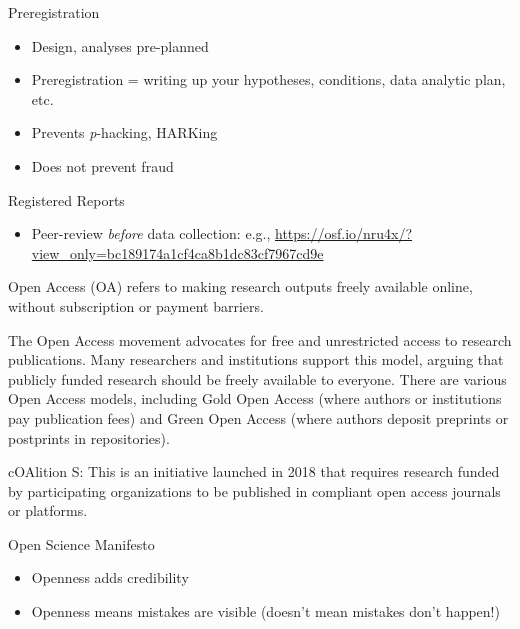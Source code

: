 \documentclass[
  ignorenonframetext,
  aspectratio=169,
]{beamer}
\providecommand{\tightlist}{%
  \setlength{\itemsep}{0pt}\setlength{\parskip}{0pt}}\usepackage{longtable,booktabs,array}
\begin{document}
\begin{frame}{Preregistration}
\label{preregistration}
\begin{itemize}
\tightlist
\item
  Design, analyses pre-planned
\item
  Preregistration = writing up your hypotheses, conditions, data
  analytic plan, etc.
\item
  Prevents \emph{p}-hacking, HARKing
\item
  Does not prevent fraud
\end{itemize}
\end{frame}

\begin{frame}{Registered Reports}
\label{registered-reports}
\begin{itemize}
\tightlist
\item
  Peer-review \emph{before} data collection: e.g.,
  \url{https://osf.io/nru4x/?view_only=bc189174a1cf4ca8b1dc83cf7967cd9e}
\end{itemize}
\end{frame}

\begin{frame}{}
\label{section-2}
Open Access (OA) refers to making research outputs freely available
online, without subscription or payment barriers.

The Open Access movement advocates for free and unrestricted access to
research publications. Many researchers and institutions support this
model, arguing that publicly funded research should be freely available
to everyone. There are various Open Access models, including Gold Open
Access (where authors or institutions pay publication fees) and Green
Open Access (where authors deposit preprints or postprints in
repositories).

cOAlition S: This is an initiative launched in 2018 that requires
research funded by participating organizations to be published in
compliant open access journals or platforms.
\end{frame}

\begin{frame}{Open Science Manifesto}
\label{open-science-manifesto}
\begin{itemize}
\tightlist
\item
  Openness adds credibility
\item
  Openness means mistakes are visible (doesn't mean mistakes don't
  happen!)
\end{itemize}
\end{frame}
\end{document}
